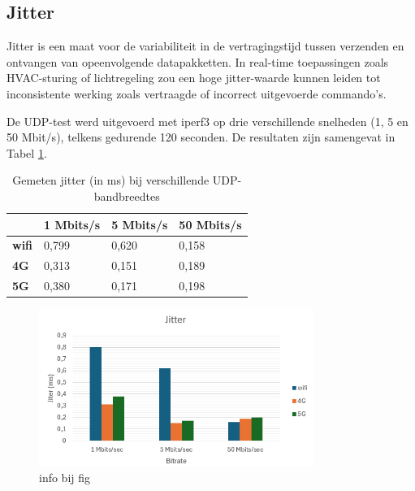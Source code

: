 \subsection{Jitter}
Jitter is een maat voor de variabiliteit in de vertragingstijd tussen verzenden en ontvangen van opeenvolgende datapakketten. In real-time toepassingen zoals HVAC-sturing of lichtregeling zou een hoge jitter-waarde kunnen leiden tot inconsistente werking zoals vertraagde of incorrect uitgevoerde commando’s.

De UDP-test werd uitgevoerd met iperf3 op drie verschillende snelheden (1, 5 en 50 Mbit/s), telkens gedurende 120 seconden. De resultaten zijn samengevat in Tabel \ref{tab:jitter}.

\begin{table}[]
    \caption{Gemeten jitter (in ms) bij verschillende UDP-bandbreedtes}
    \begin{tabular}{l l l l}
        \cline{2-4}
        & \textbf{1 Mbits/s} & \textbf{5 Mbits/s} & \textbf{50 Mbits/s} \\ \hline
        \multicolumn{1}{l}{\textbf{wifi}} & 0,799              & 0,620                 & 0,158               \\ \hline
        \multicolumn{1}{l}{\textbf{4G}}   & 0,313                & 0,151                & 0,189               \\ \hline
        \multicolumn{1}{l}{\textbf{5G}}   & 0,380               & 0,171                & 0,198               \\ \hline
    \end{tabular}
    
    \label{tab:jitter}
\end{table}
\begin{figure}

    \includegraphics[width=0.8\textwidth]{../graphics/Jitter_grafiek.png}
    \caption[grafiek van jitter test]{\label{fig:jitter}info bij fig}
\end{figure}
